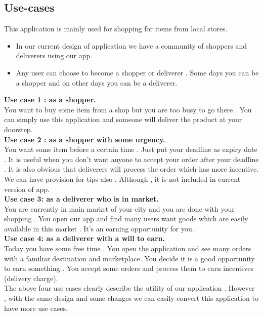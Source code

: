 \documentclass{report}
\begin{document}
\subsection{Use-cases}
This application is mainly used for shopping for items from local stores.
\begin{itemize}
\item In our current design of application we have a community of shoppers and deliverers using our app.
\item Any user can choose to become a shopper or deliverer . Some days you can be a shopper and on other days you can be a deliverer.
\end{itemize}

\textbf{Use case 1 :  as a shopper.}\\
You want to buy some item from a shop but you are too busy to go there . You can simply use this application and someone will deliver the product at your doorstep. \\

\textbf{Use case 2 : as a shopper with some urgency.}\\
You want  some item before a certain time . Just put your deadline as expiry date . It is useful when you don’t want anyone to accept your order  after your deadline . 
It is also obvious that deliverers will process the order which has more incentive. We can have provision for tips also . Although , it is not included in current version of app.\\

\textbf{Use case 3: as a deliverer who is in market.}\\
You are currently in main market of your city and you are done with your shopping . You open our app and find many users want goods which are easily available in this market  . It’s an earning opportunity for you.\\

\textbf{Use case 4: as a deliverer with a will to earn.}\\
Today you have some free time .  You open the application and see many orders with a familiar destination and marketplace. You decide  it is a good opportunity to earn something . You accept some orders and process them to earn incentives (delivery charge).\\
The above four use cases clearly describe the utility of our application . However , with the same design and some changes we can easily convert this application to have more use cases.\\
\end{document}
